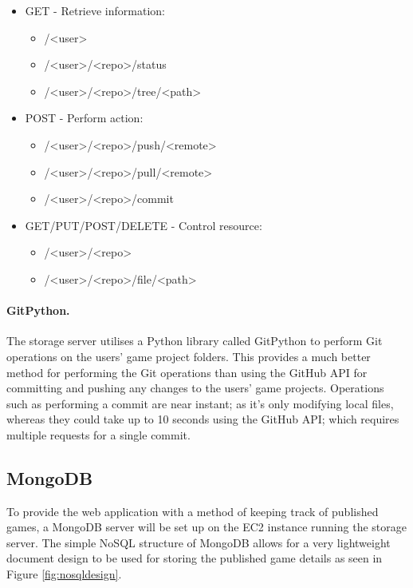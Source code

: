 	\begin{itemize}
		\item GET - Retrieve information:
		\begin{itemize}
			\item /<user>
			\item /<user>/<repo>/status
			\item /<user>/<repo>/tree/<path>
		\end{itemize}
		\item POST - Perform action:
		\begin{itemize}
			\item /<user>/<repo>/push/<remote>
			\item /<user>/<repo>/pull/<remote>
			\item /<user>/<repo>/commit
		\end{itemize}
		\item GET/PUT/POST/DELETE - Control resource:
		\begin{itemize}
			\item /<user>/<repo>
			\item /<user>/<repo>/file/<path>
		\end{itemize}
	\end{itemize}

	\paragraph{GitPython.}
	The storage server utilises a Python library called GitPython to perform Git operations on the users' game project folders. This provides a much better method for performing the Git operations than using the GitHub API for committing and pushing any changes to the users' game projects. Operations such as performing a commit are near instant; as it's only modifying local files, whereas they could take up to 10 seconds using the GitHub API; which requires multiple requests for a single commit.

	\subsection{MongoDB}
	To provide the web application with a method of keeping track of published games, a MongoDB server will be set up on the EC2 instance running the storage server. The simple NoSQL structure of MongoDB allows for a very lightweight document design to be used for storing the published game details as seen in Figure \ref{fig:nosqldesign}.


